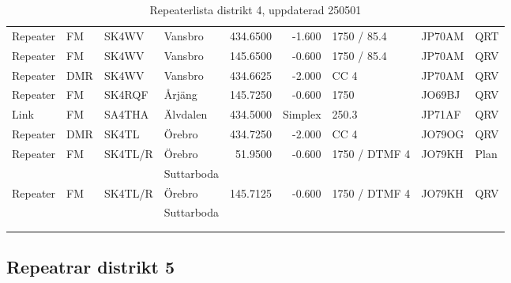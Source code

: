 \begin{longtable}{llllrrlll}
Repeater & FM         & SK4WV    & Vansbro             & 434.6500     & -1.600     & 1750 / 85.4   & JP70AM      & QRT      \\
Repeater & FM         & SK4WV    & Vansbro             & 145.6500     & -0.600     & 1750 / 85.4   & JP70AM      & QRV      \\
Repeater & DMR        & SK4WV    & Vansbro             & 434.6625     & -2.000     & CC 4          & JP70AM      & QRV      \\
Repeater & FM         & SK4RQF   & Årjäng              & 145.7250     & -0.600     & 1750          & JO69BJ      & QRV      \\
Link     & FM         & SA4THA   & Älvdalen            & 434.5000     & Simplex    & 250.3         & JP71AF      & QRV      \\
Repeater & DMR        & SK4TL    & Örebro              & 434.7250     & -2.000     & CC 4          & JO79OG      & QRV      \\
Repeater & FM         & SK4TL/R  & Örebro              & 51.9500      & -0.600     & 1750 / DTMF 4 & JO79KH      & Plan     \\
         &            &          & Suttarboda          &              &            &               &             &          \\
Repeater & FM         & SK4TL/R  & Örebro              & 145.7125     & -0.600     & 1750 / DTMF 4 & JO79KH      & QRV      \\
         &            &          & Suttarboda          &              &            &               &             &          \\
\vspace{1 ex}                                                                                                               \\
\caption{Repeaterlista distrikt 4, uppdaterad 250501}                                                                       \\
\end{longtable}

\clearpage

\subsection{Repeatrar distrikt 5}

